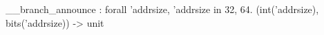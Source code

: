__branch_announce : forall 'addrsize, 'addrsize in {32, 64}. (int('addrsize), bits('addrsize)) -> unit